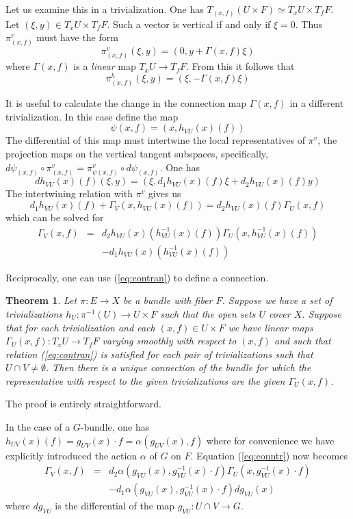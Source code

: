 \documentclass[12pt,titlepage]{article}
\newtheorem{theorem}{Theorem}
\begin{document}
Let us examine this in a  trivialization. One has
\(T_{(x,f)}(U\times F) \simeq T_xU\times T_fF\). Let \((\xi, y)\in
T_xU\times T_fF\). Such a vector is vertical if and only if \(\xi=0\).
Thus \(\pi^v_{(x,f)}\) must have
the form 
\[
\pi^v_{(x,f)}(\xi,y) =(0,y+\Gamma(x,f)\xi)
\] 
where \(\Gamma(x,f)\)
% 
is
a {\em linear\/} map \(T_xU \to T_fF\). From this  it follows that 
\[
\pi^h_{(x,f)}(\xi,y) = (\xi,-\Gamma(x,f)\xi)
\]

 It is useful to calculate the change
in the connection map \(\Gamma(x,f)\) in a different  
trivialization.
In this case define the map
\[
\psi(x,f) =(x, h_{VU}(x)(f))
\]
 The differential of this map must
intertwine the local representatives  of \(\pi^v\),
the projection maps on the
vertical tangent subspaces, specifically, \linebreak
\(d\psi_{(x,f)}\circ \pi^v_{(x,f)} = \pi^v_{\psi(x,f)}\circ
d\psi_{(x,f)}\).
   One has
\[
dh_{VU}(x)(f)(\xi,y)= (\xi, d_1h_{VU}(x)(f)\xi +
d_2h_{VU}(x)(f)y)
\]
The intertwining relation with \(\pi^v\) gives us
\[
d_1h_{VU}(x)(f) + \Gamma_V(x, h_{VU}(x)(f))=
d_2h_{VU}(x)(f)\Gamma_U(x,f)
\]
 which can be solved for
\begin{eqnarray}\label{eq:contran} \nonumber
\Gamma_V(x,f) &=& 
 d_2h_{VU}(x)(h_{VU}^{-1}(x)( f))\Gamma_U(x,
h_{VU}^{-1}(x)(f)) \\ \label{eq:conntr}
& & -d_1h_{VU}(x)(h_{VU}^{-1}(x)(f))
\end{eqnarray}%

Reciprocally, one can use (\ref{eq:contran}) to define a
connection. 

\begin{theorem}
Let \(\pi:E\to X\) be a bundle with  fiber \(F\). Suppose
we have a set of  trivializations \(h_U:\pi^{-1}(U)\to U\times F\) 
such that the open sets \(U\) cover \(X\).  Suppose that for each
trivialization and each \((x,f)\in U\times F\) we have linear maps 
\(\Gamma_U(x,f):T_xU\to T_fF\) varying smoothly with respect to 
\((x,f)\) and such
that relation (\ref{eq:contran}) is satisfied for each pair of
trivializations such that \(U\cap V\neq\emptyset\). Then there is a
unique connection of the bundle for which the  representative with
respect to the given trivializations are the given \(\Gamma_U(x,f)\).
\end{theorem}%
The proof is entirely straightforward. 

In the case of a \(G\)-bundle, one has
\(h_{UV}(x)(f)=g_{UV}(x)\cdot f=\alpha(g_{UV}(x),f)\) where for
convenience we have explicitly introduced  the action 
\(\alpha\) of \(G\)
on \(F\). Equation (\ref{eq:conntr}) now becomes
\begin{eqnarray} \nonumber
\Gamma_V(x,f) &=&
  d_2\alpha(g_{VU}(x), g_{VU}^{-1}(x)\cdot f)\Gamma_U(x,
g_{VU}^{-1}(x)\cdot f) \\ \label{eq:gconntr}
& & -d_1\alpha(g_{VU}(x), g_{VU}^{-1}(x)\cdot f)
dg_{VU}(x)
\end{eqnarray}%
where \(dg_{VU}\) is the differential of the map \(g_{VU}:U\cap V \to
G\).
\end{document}
